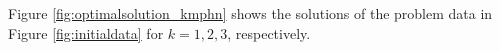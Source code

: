\documentclass[a4paper,  review, authoryear, 1p.]{elsarticle}
\begin{document}
		
		
		
		
		 Figure \ref{fig:optimalsolution_kmphn} shows the solutions of the problem data in Figure \ref{fig:initialdata} for $k=1,2,3$, respectively.
		
		 
		
\end{document}
